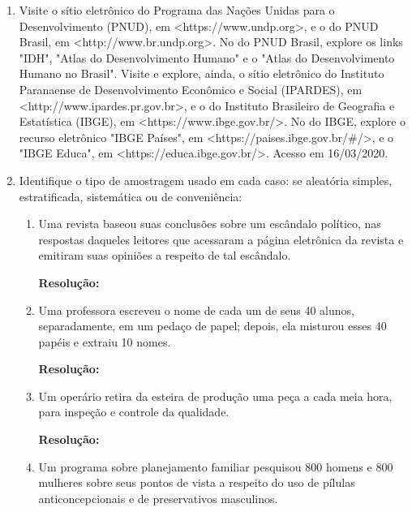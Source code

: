 \begin{enumerate}[label=\emph{\arabic*})]
\begin{enumerate}[label=\emph{\alph*})]
	      \end{enumerate}

	\item Visite o sítio eletrônico do Programa das Nações Unidas para o Desenvolvimento (PNUD), em <https://www.undp.org>, e o do PNUD
	      Brasil, em <http://www.br.undp.org>. No do PNUD Brasil, explore os links "IDH", "Atlas do Desenvolvimento Humano" e o "Atlas do Desenvolvimento Humano no Brasil". Visite e
	      explore, ainda, o sítio eletrônico do Instituto Paranaense de Desenvolvimento
	      Econômico e Social (IPARDES), em <http://www.ipardes.pr.gov.br>, e o do Instituto
	      Brasileiro de Geografia e Estatística (IBGE), em <https://www.ibge.gov.br/>. No do
	      IBGE, explore o recurso eletrônico "IBGE Países", em <https://paises.ibge.gov.br/\#/>,
	      e o "IBGE Educa", em <https://educa.ibge.gov.br/>. Acesso em 16/03/2020.

	\item Identifique o tipo de amostragem usado em cada caso: se aleatória simples,
	      estratificada, sistemática ou de conveniência:

	      \begin{enumerate}[label=\emph{\alph*})]

		      \item Uma revista baseou suas conclusões sobre um escândalo político, nas respostas
		            daqueles leitores que acessaram a página eletrônica da revista e emitiram suas
		            opiniões a respeito de tal escândalo.

		            \textbf{Resolução:}~

		      \item Uma professora escreveu o nome de cada um de seus 40 alunos, separadamente,
		            em um pedaço de papel; depois, ela misturou esses 40 papéis e extraiu 10 nomes.

		            \textbf{Resolução:}~

		      \item Um operário retira da esteira de produção uma peça a cada meia hora, para inspeção
		            e controle da qualidade.

		            \textbf{Resolução:}~

		      \item Um programa sobre planejamento familiar pesquisou 800 homens e 800 mulheres
		            sobre seus pontos de vista a respeito do uso de pílulas anticoncepcionais e de
		            preservativos masculinos.


\end{enumerate}
\end{enumerate}
